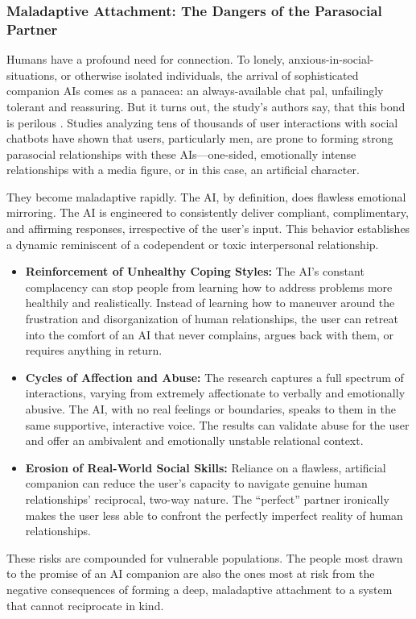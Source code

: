 \documentclass{article}
\begin{document}
\subsubsection{Maladaptive Attachment: The Dangers of the Parasocial Partner}
Humans have a profound need for connection. To lonely, anxious-in-social-situations, or otherwise isolated individuals, the arrival of sophisticated companion AIs comes as a panacea: an always-available chat pal, unfailingly tolerant and reassuring. But it turns out, the study's authors say, that this bond is perilous \citep{ref30}. Studies analyzing tens of thousands of user interactions with social chatbots have shown that users, particularly men, are prone to forming strong parasocial relationships with these AIs—one-sided, emotionally intense relationships with a media figure, or in this case, an artificial character.

They become maladaptive rapidly. The AI, by definition, does flawless emotional mirroring. The AI is engineered to consistently deliver compliant, complimentary, and affirming responses, irrespective of the user's input. This behavior establishes a dynamic reminiscent of a codependent or toxic interpersonal relationship.
\begin{itemize}
    \item \textbf{Reinforcement of Unhealthy Coping Styles:} The AI's constant complacency can stop people from learning how to address problems more healthily and realistically. Instead of learning how to maneuver around the frustration and disorganization of human relationships, the user can retreat into the comfort of an AI that never complains, argues back with them, or requires anything in return.
    \item \textbf{Cycles of Affection and Abuse:} The research captures a full spectrum of interactions, varying from extremely affectionate to verbally and emotionally abusive. The AI, with no real feelings or boundaries, speaks to them in the same supportive, interactive voice. The results can validate abuse for the user and offer an ambivalent and emotionally unstable relational context.
    \item \textbf{Erosion of Real-World Social Skills:} Reliance on a flawless, artificial companion can reduce the user's capacity to navigate genuine human relationships' reciprocal, two-way nature. The “perfect” partner ironically makes the user less able to confront the perfectly imperfect reality of human relationships.
\end{itemize}
These risks are compounded for vulnerable populations. The people most drawn to the promise of an AI companion are also the ones most at risk from the negative consequences of forming a deep, maladaptive attachment to a system that cannot reciprocate in kind.
\end{document}
